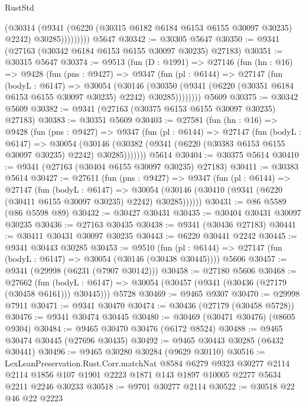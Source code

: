 \begin{lexlean}{RustStd}
\begin{coremodule}
                  (@30314
                    (@9341
                      (@6220 (@30315 @6182 @6184 @6153 @6155 @30097 @30235) @2242)
                      @30285)))))))))
    @5647
@30342 := @30305 @5647
@30350 := @9341 (@27163 (@30342 @6184 @6153 @6155 @30097 @30235) @27183)
@30351 := @30315 @5647
@30374 := @9513
    (fun (D : @1991) =>
    @27146
      (fun (hn : @16) =>
      @9428
        (fun (pns : @9427) =>
        @9347
          (fun (pl : @6144) =>
          @27147
            (fun (bodyL : @6147) =>
            @30054
              (@30146
                (@30350 (@9341 (@6220 (@30351 @6184 @6153 @6155 @30097 @30235) @2242) @30285))))))))
    @5609
@30375 := @30342 @5609
@30382 := @9341 (@27163 (@30375 @6153 @6155 @30097 @30235) @27183)
@30383 := @30351 @5609
@30403 := @27581
    (fun (hn : @16) =>
    @9428
      (fun (pns : @9427) =>
      @9347
        (fun (pl : @6144) =>
        @27147
          (fun (bodyL : @6147) =>
          @30054
            (@30146 (@30382 (@9341 (@6220 (@30383 @6153 @6155 @30097 @30235) @2242) @30285)))))))
    @5614
@30404 := @30375 @5614
@30410 := @9341 (@27163 (@30404 @6155 @30097 @30235) @27183)
@30411 := @30383 @5614
@30427 := @27611
    (fun (pns : @9427) =>
    @9347
      (fun (pl : @6144) =>
      @27147
        (fun (bodyL : @6147) =>
        @30054 (@30146 (@30410 (@9341 (@6220 (@30411 @6155 @30097 @30235) @2242) @30285))))))
@30431 := @86 @5589 (@86 @5598 @89)
@30432 := @30427 @30431
@30435 := @30404 @30431 @30097 @30235
@30436 := @27163 @30435
@30438 := @9341 (@30436 @27183)
@30441 := @30411 @30431 @30097 @30235
@30443 := @6220 @30441 @2242
@30445 := @9341 @30443 @30285
@30453 := @9510
    (fun (pl : @6144) => @27147 (fun (bodyL : @6147) => @30054 (@30146 (@30438 @30445))))
    @5606
@30457 := @9341 (@29998 (@6231 (@7907 @30142)))
@30458 := @27180 @5606
@30468 := @27662
    (fun (bodyL : @6147) => @30054 (@30457 (@9341 (@30436 (@27179 (@30458 @6161))) @30445)))
    @5728
@30469 := @9465 @9307
@30470 := @29998 @7911
@30471 := @9341 @30470
@30474 := @30436 (@27179 (@30458 @5728))
@30476 := @9341 @30474 @30445
@30480 := @30469 (@30471 @30476) (@8605 @9304)
@30484 := @9465 @30470 @30476 (@6172 @8524)
@30488 := @9465 @30474 @30445 (@27696 @30435)
@30492 := @9465 @30443 @30285 (@6432 @30441)
@30496 := @9465 @30280 @30284 (@9629 @30110)
@30516 := LexLeanPreservation.Rust.Corr.matchNat
    @8584
    @6279
    @9323
    @30277
    @2114
    @2114
    @1856
    @107
    @1901
    @2223
    @1871
    @143
    @1897
    @10005
    @2277
    @5634
    @2211
    @2246
    @30233
@30518 := @9701 @30277 @2114
@30522 := @30518 @22 @46 @22 @2223

\end{coremodule}
\end{lexlean}
